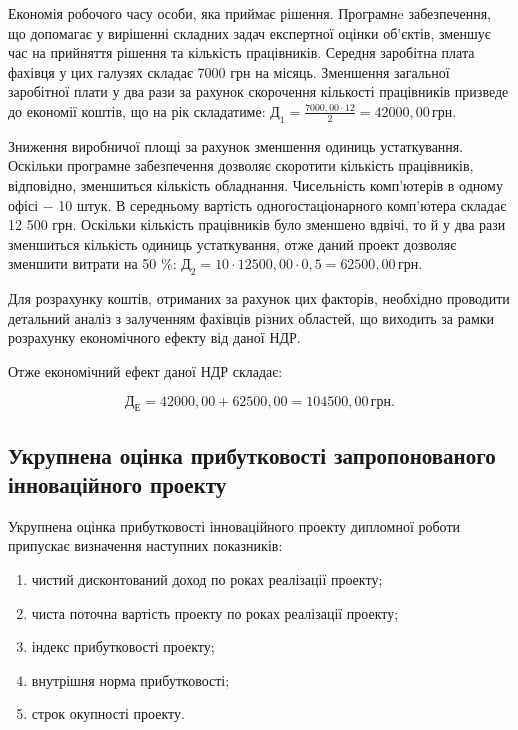 Економія робочого часу особи, яка приймає рішення. Програмнe забезпечення, що допомагає у вирішенні складних задач експертної оцінки об’єктів, зменшує час на прийняття рішення та кількість працівників. Середня заробітна плата фахівця у цих галузях складає 7000 грн на місяць. Зменшення загальної заробітної плати у два рази за рахунок скорочення кількості працівників призведе до економії коштів, що на рік складатиме: $\text{Д}_{1} = \frac{7000,00 \cdot 12}{2} = 42000,00 \, \text{грн}$.

Зниження виробничої площі за рахунок зменшення одиниць устаткування. Оскільки програмне забезпечення дозволяє скоротити кількість працівників, відповідно, зменшиться кількість обладнання. Чисельність комп’ютерів в одному офісі $-$ 10 штук. В середньому вартість одногостаціонарного комп’ютера складає 12 500 грн. Оскільки кількість працівників було зменшено вдвічі, то й у два рази зменшиться кількість одиниць устаткування, отже даний проект дозволяє зменшити витрати на 50 \%: $\text{Д}_{2} = 10 \cdot 12500,00 \cdot 0,5 = 62500,00 \, \text{грн}$.

Для розрахунку коштів, отриманих за рахунок цих факторів, необхідно проводити детальний аналіз з залученням фахівців різних областей, що виходить за рамки розрахунку економічного ефекту від даної НДР.

Отже економічний ефект даної НДР складає:

\[
	\text{Д}_{\text{Е}} = 42000,00 + 62500,00 = 104500,00 \, \text{грн}.
\]

\vspace{1.5em}

\subsection{Укрупнена оцінка прибутковості запропонованого інноваційного проекту}

Укрупнена оцінка прибутковості інноваційного проекту дипломної роботи припускає визначення наступних показників:

\begin{enumerate}
	\item чистий дисконтований доход по роках реалізації проекту;
	\item чиста поточна вартість проекту по роках реалізації проекту;
	\item індекс прибутковості проекту;
	\item внутрішня норма прибутковості;
	\item строк окупності проекту.
\end{enumerate}

